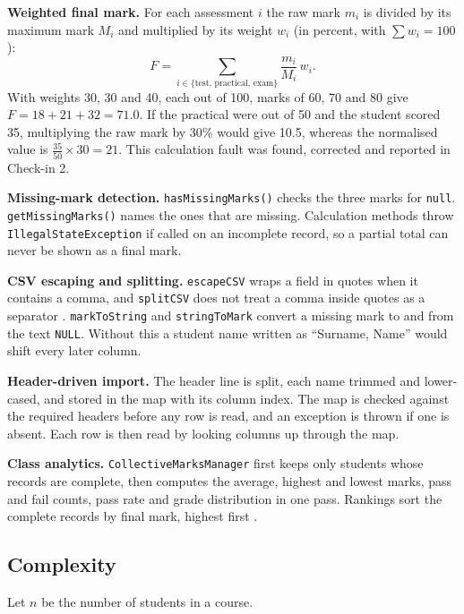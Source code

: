 \textbf{Weighted final mark.} For each assessment $i$ the raw mark $m_i$ is divided by its maximum mark $M_i$ and multiplied by its weight $w_i$ (in percent, with $\sum w_i = 100$):
\begin{equation}
F = \sum_{i \in \{\mathrm{test},\,\mathrm{practical},\,\mathrm{exam}\}} \frac{m_i}{M_i}\, w_i .
\end{equation}
With weights 30, 30 and 40, each out of 100, marks of 60, 70 and 80 give $F = 18 + 21 + 32 = 71.0$. If the practical were out of 50 and the student scored 35, multiplying the raw mark by 30\% would give 10.5, whereas the normalised value is $\tfrac{35}{50}\times 30 = 21$. This calculation fault was found, corrected and reported in Check-in 2.

\textbf{Missing-mark detection.} \texttt{hasMissingMarks()} checks the three marks for \texttt{null}. \texttt{getMissingMarks()} names the ones that are missing. Calculation methods throw \texttt{IllegalStateException} if called on an incomplete record, so a partial total can never be shown as a final mark.

\textbf{CSV escaping and splitting.} \texttt{escapeCSV} wraps a field in quotes when it contains a comma, and \texttt{splitCSV} does not treat a comma inside quotes as a separator \cite{rfc4180}. \texttt{markToString} and \texttt{stringToMark} convert a missing mark to and from the text \texttt{NULL}. Without this a student name written as ``Surname, Name'' would shift every later column.

\textbf{Header-driven import.} The header line is split, each name trimmed and lower-cased, and stored in the map with its column index. The map is checked against the required headers before any row is read, and an exception is thrown if one is absent. Each row is then read by looking columns up through the map.

\textbf{Class analytics.} \texttt{CollectiveMarksManager} first keeps only students whose records are complete, then computes the average, highest and lowest marks, pass and fail counts, pass rate and grade distribution in one pass. Rankings sort the complete records by final mark, highest first \cite{clrs}.

\subsection{Complexity}
Let $n$ be the number of students in a course.

